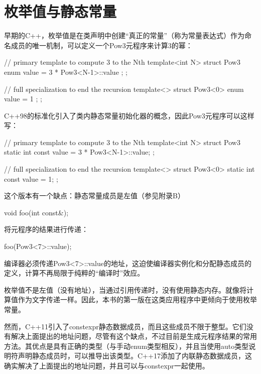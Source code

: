 \section{枚举值与静态常量}

早期的C++，枚举值是在类声明中创建“真正的常量”（称为常量表达式）作为命名成员的唯一机制，可以定义一个Pow3元程序来计算3的幂：

\begin{cpp}
// primary template to compute 3 to the Nth
template<int N>
struct Pow3 {
	enum { value = 3 * Pow3<N-1>::value };
};

// full specialization to end the recursion
template<>
struct Pow3<0> {
	enum { value = 1 };
};
\end{cpp}

C++98的标准化引入了类内静态常量初始化器的概念，因此Pow3元程序可以这样写：

\begin{cpp}
// primary template to compute 3 to the Nth
template<int N>
struct Pow3 {
	static int const value = 3 * Pow3<N-1>::value;
};

// full specialization to end the recursion
template<>
struct Pow3<0> {
	static int const value = 1;
};
\end{cpp}

这个版本有一个缺点：静态常量成员是左值（参见附录B）

\begin{cpp}
void foo(int const&);
\end{cpp}

将元程序的结果进行传递：

\begin{cpp}
foo(Pow3<7>::value);
\end{cpp}

编译器必须传递Pow3<7>::value的地址，这迫使编译器实例化和分配静态成员的定义，计算不再局限于纯粹的“编译时”效应。

枚举值不是左值（没有地址），当通过引用传递时，没有使用静态内存。就像将计算值作为文字传递一样。因此，本书的第一版在这类应用程序中更倾向于使用枚举常量。

然而，C++11引入了constexpr静态数据成员，而且这些成员不限于整型。它们没有解决上面提出的地址问题，尽管有这个缺点，不过目前是生成元程序结果的常用方法。其优点是具有正确的类型（与手动enum类型相反），并且当使用auto类型说明符声明静态成员时，可以推导出该类型。C++17添加了内联静态数据成员，这确实解决了上面提出的地址问题，并且可以与constexpr一起使用。























